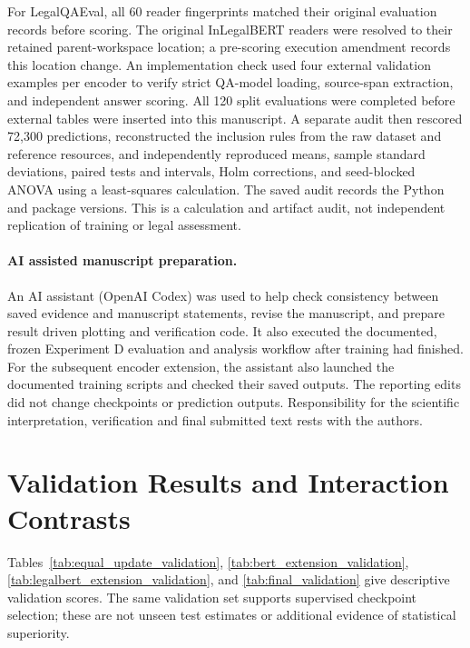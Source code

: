 \documentclass[pdflatex,sn-basic]{sn-jnl}
\begin{document}
For LegalQAEval, all 60 reader fingerprints matched their original evaluation
records before scoring. The original InLegalBERT readers were resolved to
their retained parent-workspace location; a pre-scoring execution amendment
records this location change. An implementation check used four external
validation examples per encoder to verify strict QA-model loading, source-span
extraction, and independent answer scoring. All 120 split evaluations were
completed before external tables were inserted into this manuscript. A separate
audit then rescored 72,300 predictions, reconstructed the inclusion rules from
the raw dataset and reference resources, and independently reproduced means,
sample standard deviations, paired tests and intervals, Holm corrections, and
seed-blocked ANOVA using a least-squares calculation. The saved audit records
the Python and package versions. This is a calculation and artifact audit,
not independent replication of training or legal assessment.

\paragraph*{AI assisted manuscript preparation.}
An AI assistant (OpenAI Codex) was used to help check consistency between
saved evidence and manuscript statements, revise the manuscript, and prepare
result driven plotting and verification code. It also executed the documented,
frozen Experiment D evaluation and analysis workflow after training had
finished. For the subsequent encoder extension, the assistant also launched
the documented training scripts and checked their saved outputs. The reporting
edits did not change checkpoints or prediction outputs.
Responsibility for the scientific interpretation, verification and
final submitted text rests with the authors.

\section{Validation Results and Interaction Contrasts}\label{app:validation}

Tables~\ref{tab:equal_update_validation},
\ref{tab:bert_extension_validation},
\ref{tab:legalbert_extension_validation}, and
\ref{tab:final_validation} give descriptive validation scores. The same
validation set supports supervised checkpoint selection; these are not unseen
test estimates or additional evidence of statistical superiority.
\end{document}

